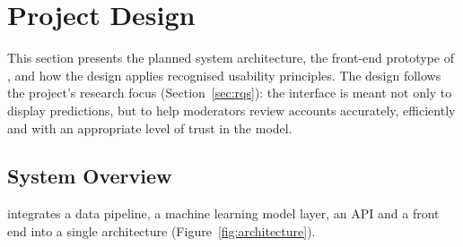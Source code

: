 \section{Project Design}\label{sec:design}

This section presents the planned system architecture, the front-end prototype of \projectname{}, and how the design applies recognised usability principles. The design follows the project's research focus (Section~\ref{sec:rqs}): the interface is meant not only to display predictions, but to help moderators review accounts accurately, efficiently and with an appropriate level of trust in the model.


\subsection{System Overview}\label{sec:system-overview}

\projectname{} integrates a data pipeline, a machine learning model layer, an API and a front end into a single architecture (Figure~\ref{fig:architecture}).

